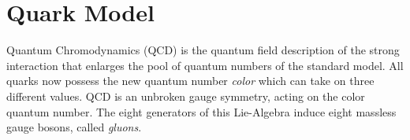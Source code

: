 %
\section{Quark Model}
Quantum Chromodynamics (QCD) is the quantum field description of the strong interaction that enlarges the pool of quantum numbers of the standard model.
All quarks now possess the new quantum number \textit{color} which can take on three different values.
QCD is an unbroken \grpsuthree gauge symmetry, acting on the color quantum number.
The eight generators of this Lie-Algebra induce eight massless gauge bosons, called \textit{gluons}.


